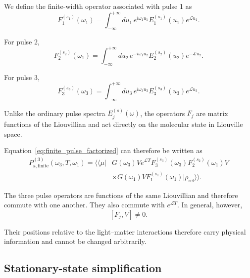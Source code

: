 \documentclass[11pt]{article}
\begin{document}
We define the finite-width operator associated with pulse 1 as
%
\begin{equation}
\boxed{
F_1^{(s_1)}(\omega_1)
=
\int_{-\infty}^{+\infty}
du_1\,
e^{i\omega_1u_1}
E_1^{(s_1)}(u_1)
e^{\mathcal{L}u_1}.
}
\label{eq:F1_definition}
\end{equation}

For pulse 2,
%
\begin{equation}
\boxed{
F_2^{(s_2)}(\omega_1)
=
\int_{-\infty}^{+\infty}
du_2\,
e^{-i\omega_1u_2}
E_2^{(s_2)}(u_2)
e^{-\mathcal{L}u_2}.
}
\label{eq:F2_definition}
\end{equation}

For pulse 3,
%
\begin{equation}
\boxed{
F_3^{(s_3)}(\omega_3)
=
\int_{-\infty}^{+\infty}
du_3\,
e^{i\omega_3u_3}
E_3^{(s_3)}(u_3)
e^{\mathcal{L}u_3}.
}
\label{eq:F3_definition}
\end{equation}

Unlike the ordinary pulse spectra $E_j^{(s)}(\omega)$, the operators
$F_j$ are matrix functions of the Liouvillian and act directly on the
molecular state in Liouville space.

Equation~\eqref{eq:finite_pulse_factorized} can therefore be written
as
%
\begin{equation}
\boxed{
\begin{aligned}
P_{\mathbf{s},\mathrm{finite}}^{(3)}
(\omega_3,T,\omega_1)
=
\langle\!\langle\mu|
&G(\omega_3)
V
e^{\mathcal{L}T}
F_3^{(s_3)}(\omega_3)
F_2^{(s_2)}(\omega_1)
V
\\
&\times
G(\omega_1)
V
F_1^{(s_1)}(\omega_1)
|\rho_{\mathrm{ref}}\rangle\rangle .
\end{aligned}
}
\label{eq:finite_general_F123}
\end{equation}

The three pulse operators are functions of the same Liouvillian and
therefore commute with one another. They also commute with
$e^{\mathcal{L}T}$. In general, however,
%
\begin{equation}
\boxed{
[F_j,V]\neq0.
}
\end{equation}

Their positions relative to the light--matter interactions therefore
carry physical information and cannot be changed arbitrarily.


\subsection{Stationary-state simplification}
\label{subsec:stationary_F1}
\end{document}
